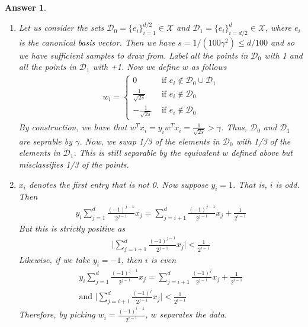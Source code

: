 \documentclass[12pt]{article}
\theoremstyle{colon}
\newtheorem*{answer}{Answer}
\begin{document}
\begin{answer}
  \leavevmode
  \begin{enumerate}[label=\arabic*)]
    \item Let us consider the sets $\mathcal{D}_0 = \{e_i\}_{i=1}^{d/2} \in \mathcal{X}$ and $\mathcal{D}_1 = \{e_i\}_{i=d/2}^{d} \in \mathcal{X}$, where $e_i$ is the canonical basis vector. Then we have $s = 1/(100 \gamma^2) \leq d/100$ and so we have sufficient samples to draw from. Label all the points in $\mathcal{D}_0$ with 1 and all the points in $\mathcal{D}_1$ with +1. Now we define $w$ as follows
      \begin{gather*}
        w_i = \begin{cases}
          0 & \text{ if } e_i \notin \mathcal{D}_0 \cup \mathcal{D}_1 \\
          \frac{1}{\sqrt{2s}} & \text{ if } e_i \notin \mathcal{D}_0 \\
          -\frac{1}{\sqrt{2s}} & \text{ if } e_i \notin \mathcal{D}_0
        \end{cases}
      \end{gather*}
      By construction, we have that $w^T x_i = y_i w^T x_i = \frac{1}{\sqrt{2s}} > \gamma$. Thus, $\mathcal{D}_0$ and $\mathcal{D}_1$ are seprable by $\gamma$. Now, we swap 1/3 of the elements in $\mathcal{D}_0$ with 1/3 of the elements in $\mathcal{D}_1$. This is still separable by the equivalent $w$ defined above but misclassifies 1/3 of the points.

    \item $x_i$ denotes the first entry that is not 0. Now suppose $y_i = 1$. That is, $i$ is odd. Then
      \begin{gather*}
        y_i \sum_{j=1}^d \frac{(-1)^{j-1}}{2^{j-1}}x_j = \sum_{j=i+1}^d \frac{(-1)^{j-1}}{2^{j-1}}x_j + \frac{1}{2^{i-1}}
      \end{gather*}
      But this is strictly positive as
      \begin{gather*}
        \lvert \sum_{j=i+1}^d \frac{(-1)^{j-1}}{2^{j-1}}x_j \rvert < \frac{1}{2^{i-1}}
      \end{gather*}
      Likewise, if we take $y_i = -1$, then $i$ is even
      \begin{gather*}
        y_i \sum_{j=1}^d \frac{(-1)^{j-1}}{2^{j-1}}x_j = \sum_{j=i+1}^d \frac{(-1)^{j}}{2^{j-1}}x_j + \frac{1}{2^{i-1}} \\
        \text{and } \lvert \sum_{j=i+1}^d \frac{(-1)^{j}}{2^{j-1}}x_j \rvert < \frac{1}{2^{i-1}}
      \end{gather*}
      Therefore, by picking $w_i = \frac{(-1)^{i-1}}{2^{i-1}}$, $w$ separates the data.


\end{enumerate}
\end{answer}
\end{document}
